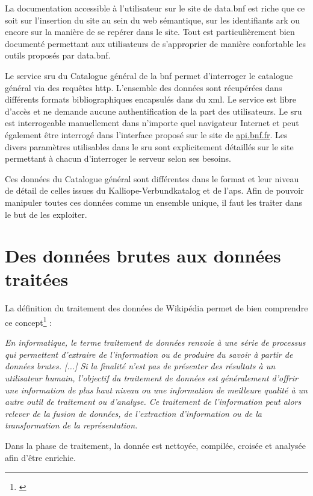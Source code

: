 \documentclass[a4paper, 12pt, twoside]{book}
\begin{document}
La documentation accessible à l'utilisateur sur le site de data.bnf est riche que ce soit sur l'insertion du site au sein du web sémantique, sur les identifiants \gls{ark} ou encore sur la manière de se repérer dans le site. Tout est particulièrement bien documenté permettant aux utilisateurs de s'approprier de manière confortable les outils proposés par data.bnf. 

Le service \gls{sru} du Catalogue général de la \gls{bnf} permet d'interroger le catalogue général via des requêtes \gls{http}. L'ensemble des données sont récupérées dans différents formats bibliographiques encapsulés dans du \gls{xml}. Le service est libre d'accès et ne demande aucune authentification de la part des utilisateurs. Le \gls{sru} est interrogeable manuellement dans n'importe quel navigateur Internet et peut également être interrogé dans l'interface proposé sur le site de \href{https://api.bnf.fr/fr/api-sru-catalogue-general#/}{api.bnf.fr}. Les divers paramètres utilisables dans le \gls{sru} sont explicitement détaillés sur le site permettant à chacun d'interroger le serveur selon ses besoins. 

Ces données du Catalogue général sont différentes dans le format et leur niveau de détail de celles issues du Kalliope-Verbundkatalog et de l'\gls{aps}. Afin de pouvoir manipuler toutes ces données comme un ensemble unique, il faut les traiter dans le but de les exploiter. 

\chapter{Des données brutes aux données traitées}
\label{chap:brutesàtraitées}
La définition du traitement des données de Wikipédia permet de bien comprendre ce concept\footnote{\cite{wiki_traitement_2021}} :

\begin{changemargin}{1cm}{1cm}
\textit{
En informatique, le terme traitement de données renvoie à une série de processus qui permettent d'extraire de l'information ou de produire du savoir à partir de données brutes. [...]
Si la finalité n'est pas de présenter des résultats à un utilisateur humain, l'objectif du traitement de données est généralement d'offrir une information de plus haut niveau ou une information de meilleure qualité à un autre outil de traitement ou d'analyse. Ce traitement de l'information peut alors relever de la fusion de données, de l'extraction d'information ou de la transformation de la représentation. }
\end{changemargin}
Dans la phase de traitement, la donnée est nettoyée, compilée, croisée et analysée afin d'être enrichie.
\end{document}
